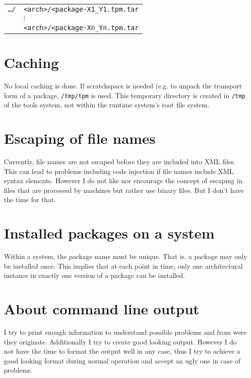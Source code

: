 \documentclass[a4paper]{article}
\newcommand{\file}[1]{\texttt{#1}}
\begin{document}
	\vspace{1em}	
	\noindent
	\begin{tabular}{rl}
		\file{\dots/} & \file{<arch>/<package-X1\_Y1.tpm.tar} \\
		& \hspace{0.5cm} $\vdots$ \\
		& \file{<arch>/<package-Xn\_Yn.tpm.tar} \\
	\end{tabular}

	\section{Caching}
	\label{sec:caching}
	
	No local caching is done. If scratchspace is needed (e.g. to unpack the transport form of a package, \file{/tmp/tpm} is used. This temporary directory is created in \file{/tmp} of the tools system, not within the runtime system's root file system.
	
	\section{Escaping of file names}
	\label{sec:escaping_of_file_names}
	
	Currently, file names are not escaped before they are included into XML files. This can lead to problems including code injection if file names include XML syntax elements. However I do not like nor encourage the concept of escaping in files that are processed by machines but rather use binary files. But I don't have the time for that.
	
	\section{Installed packages on a system}
	\label{sec:installed_packages_on_a_system}
	
	Within a system, the package name must be unique. That is, a package may only be installed once. This implies that at each point in time, only one architectural instance in exactly one version of a package can be installed.
	
	\section{About command line output}
	\label{sec:about_command_line_output}
	
	I try to print enough information to understand possible problems and from were they originate. Additionally I try to create good looking output. However I do not have the time to format the output well in any case, thus I try to achieve a good looking format during normal operation and accept an ugly one in case of problems.
	
\end{document}
